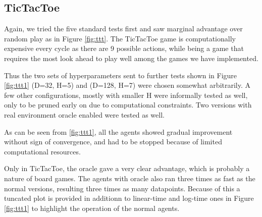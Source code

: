 \documentclass{article}
\let\Oldsubsection\subsection
\renewcommand{\subsection}{\FloatBarrier\Oldsubsection}
\begin{document}
\begin{flushleft}
\begin{figure}
\end{figure}


\newpage

\subsection{TicTacToe}

Again, we tried the five standard tests first
and saw marginal advantage over random play
as in Figure \ref{fig:ttt}.
The TicTacToe game is computationally
expensive every cycle as there are
9 possible actions,
while being a game that requires the most look ahead
to play well among the games we have implemented.

Thus the two sets of hyperparameters sent
to further tests shown in Figure \ref{fig:ttt1}
(D=32, H=5) and (D=128, H=7) 
were chosen somewhat arbitrarily.
A few other configurations, mostly with
smaller H were informally
tested as well, only to be pruned 
early on due to computational constraints.
Two versions with real environment oracle
enabled were tested as well.

As can be seen from \ref{fig:ttt1}, all the agents showed gradual improvement
without sign of convergence, and had to be stopped because of
limited computational resources.

Only in TicTacToe, the oracle gave 
a very clear advantage, which is probably a
nature of board games. The agents
with oracle also ran three times as fast
as the normal versions, resulting three times
as many datapoints. Because of this
a tuncated plot is provided in additionn 
to linear-time and log-time ones in Figure \ref{fig:ttt1}
to highlight the operation 
of the normal agents.

\begin{figure}
\vspace{-5em}
\end{figure}


\end{flushleft}
\end{document}
